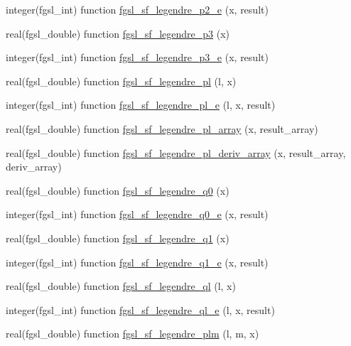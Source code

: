 \begin{DoxyCompactItemize}
integer(fgsl\+\_\+int) function \hyperlink{specfunc_8finc_a2650254eeeb5b0047d60c8710c64cc7a}{fgsl\+\_\+sf\+\_\+legendre\+\_\+p2\+\_\+e} (x, result)
\item 
real(fgsl\+\_\+double) function \hyperlink{specfunc_8finc_a716b4f9763c898ae50a684e3008d50f1}{fgsl\+\_\+sf\+\_\+legendre\+\_\+p3} (x)
\item 
integer(fgsl\+\_\+int) function \hyperlink{specfunc_8finc_a7ce68144036ae6e97c835517bbc45400}{fgsl\+\_\+sf\+\_\+legendre\+\_\+p3\+\_\+e} (x, result)
\item 
real(fgsl\+\_\+double) function \hyperlink{specfunc_8finc_afb0baf64a977e0dabe33ad79c96570f8}{fgsl\+\_\+sf\+\_\+legendre\+\_\+pl} (l, x)
\item 
integer(fgsl\+\_\+int) function \hyperlink{specfunc_8finc_aa58254a8ae52577f262870394cdd2e82}{fgsl\+\_\+sf\+\_\+legendre\+\_\+pl\+\_\+e} (l, x, result)
\item 
real(fgsl\+\_\+double) function \hyperlink{specfunc_8finc_a1bd8989dcb5b50de3ef365ee3faeda9b}{fgsl\+\_\+sf\+\_\+legendre\+\_\+pl\+\_\+array} (x, result\+\_\+array)
\item 
real(fgsl\+\_\+double) function \hyperlink{specfunc_8finc_adbc4685f0f40698c6cb104d0fc16e719}{fgsl\+\_\+sf\+\_\+legendre\+\_\+pl\+\_\+deriv\+\_\+array} (x, result\+\_\+array, deriv\+\_\+array)
\item 
real(fgsl\+\_\+double) function \hyperlink{specfunc_8finc_a947175f5f90940488727610a78674043}{fgsl\+\_\+sf\+\_\+legendre\+\_\+q0} (x)
\item 
integer(fgsl\+\_\+int) function \hyperlink{specfunc_8finc_ad601f9cd38bce88eafd6800f6c5dfce0}{fgsl\+\_\+sf\+\_\+legendre\+\_\+q0\+\_\+e} (x, result)
\item 
real(fgsl\+\_\+double) function \hyperlink{specfunc_8finc_af91dbd074093a7e9197a9c056faa8bd9}{fgsl\+\_\+sf\+\_\+legendre\+\_\+q1} (x)
\item 
integer(fgsl\+\_\+int) function \hyperlink{specfunc_8finc_a6717b9f8c5bbe2d16c0945f8f6ba4e31}{fgsl\+\_\+sf\+\_\+legendre\+\_\+q1\+\_\+e} (x, result)
\item 
real(fgsl\+\_\+double) function \hyperlink{specfunc_8finc_a241fb356e66dcf70f7490f778260efb7}{fgsl\+\_\+sf\+\_\+legendre\+\_\+ql} (l, x)
\item 
integer(fgsl\+\_\+int) function \hyperlink{specfunc_8finc_a37ea075ca4b4e399d0ce8d823f3bca11}{fgsl\+\_\+sf\+\_\+legendre\+\_\+ql\+\_\+e} (l, x, result)
\item 
real(fgsl\+\_\+double) function \hyperlink{specfunc_8finc_aa6ad8aad3b72623dc894234a51bf0f02}{fgsl\+\_\+sf\+\_\+legendre\+\_\+plm} (l, m, x)

\end{DoxyCompactItemize}
